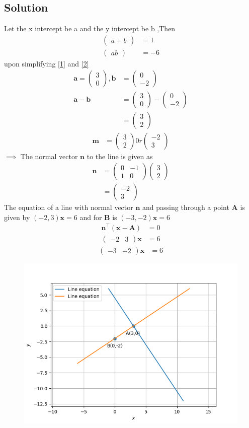 \documentclass[12pt]{article}
\providecommand{\brak}[1]{\ensuremath{\left(#1\right)}}
\newcommand{\myvec}[1]{\ensuremath{\begin{pmatrix}#1\end{pmatrix}}}
\let\vec\mathbf
\begin{document}
\begin{enumerate}
\section{Solution}
Let the x intercept be a and  the y intercept be b ,Then
\begin{align}
\myvec{a+b}&=1\label{1}\\
\myvec{ab}&=-6 \label{2}
\end{align}
upon simplifying \eqref{1} and \eqref{2}
\begin{align}
\vec{a}=\myvec{3\\0},\vec{b}&=\myvec{0\\-2}\\
\vec{a-b}&=\myvec{3\\0}-\myvec{0\\-2}\\
&=\myvec{3\\2}
\end{align}
\begin{align}		
\vec{m}&=\myvec{3\\2}0r \myvec{-2\\3}
\end{align}
$\implies$ The normal vector $\vec{n}$ to the line is given as
\begin{align}
\vec{n}&=\myvec{0&-1\\1&0}\myvec{3\\2}\\
&=\myvec{-2 \\3} 
\end{align}
The equation of a line with normal vector $\vec{n}$ and passing through a point $\vec{A}$ is given by $(-2,3)\vec{x}=6$ and for $\vec{B}$ is $(-3,-2)\vec{x}=6$
\begin{align}
	\vec{n}^\top\brak{\vec{x}-\vec{A}} &= 0 \\
	\myvec { -2 & 3 } \vec{x}  &= 6  
\end{align}
\hspace{60mm Or}
\begin{align}
	\myvec { -3 & -2 }  \vec{x}  &= 6        
\end{align}
\begin{figure}[h!]
\centering
\includegraphics[width=\columnwidth]{./figs/inter.png}
\caption{}
\label{fig:line segment}
\end{figure}
\end{enumerate}
\end{document}
